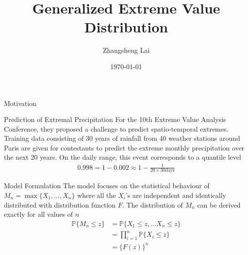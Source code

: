 \documentclass[10pt]{beamer}
\title{Generalized Extreme Value Distribution}
\subtitle{}
\author{Zhangsheng Lai}
\date{\today}
\begin{document}
\begin{frame}
\titlepage
\end{frame}



\begin{frame}{Motivation}
\begin{alertblock}{Prediction of Extremal Precipitation}
For the 10th Extreme Value Analysis Conference, they proposed a challenge to predict spatio-temporal extremes. Training data consisting of 30 years of rainfall from 40 weather stations around Paris are given for contestants to predict the extreme monthly precipitation over the next 20 years. On the daily range, this event corresponds to a quantile level 
\begin{align*}
0.998 = 1 - 0.002 \approx 1- \frac{1}{20 \times 30 \text{days}}
\end{align*}
\end{alertblock}
\end{frame}

\begin{frame}{Model Formulation}
The model focuses on the statistical behaviour of $M_n = \max\{X_1,\ldots,X_n\}$ where all the $X_i$'s are independent and identically distributed with distribution function $F$. The distribution of $M_n$ can be derived exactly for all values of $n$
\begin{align}
\mathbb{P}\{M_n\leq z\} &= \mathbb{P}\{X_1\leq z , \ldots X_n \leq z\}\nonumber\\
&= \prod_{i=1}^{n}\mathbb{P}\{X_i\leq z\}\nonumber\\
&=\{F(z)\}^n \label{eq:maxofrv}
\end{align}
\end{frame}


%
\end{document}
